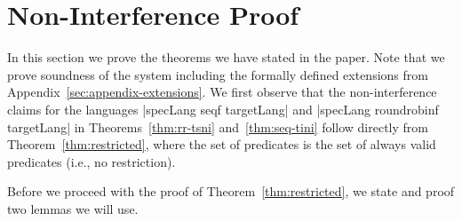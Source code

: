 \section{Non-Interference Proof}
\label{sec:appendix}
\label{sec:app:proof}

In this section we prove the theorems we have stated in the paper.
Note that we prove soundness of the system including the formally
defined extensions from Appendix~\ref{sec:appendix-extensions}.
We first observe that the non-interference claims for the languages
|specLang seqf targetLang| and |specLang roundrobinf targetLang|
in Theorems~\ref{thm:rr-tsni} and~\ref{thm:seq-tini} follow directly
from Theorem~\ref{thm:restricted}, where the set
of predicates is the set of always valid predicates (i.e., no restriction).

Before we proceed with the proof of Theorem~\ref{thm:restricted},
we state and proof two lemmas we will use.

